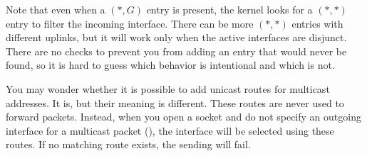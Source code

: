 Note that even when a $(*,G)$ entry is present, the kernel looks for a $(*,*)$
entry to filter the incoming interface. There can be more $(*,*)$ entries with
different uplinks, but it will work only when the active interfaces are
disjunct. There are no checks to prevent you from adding an entry that would
never be found, so it is hard to guess which behavior is intentional and which
is not.

You may wonder whether it is possible to add unicast routes for multicast
addresses. It is, but their meaning is different. These routes are never used
to forward packets. Instead, when you open a socket and do not specify an
outgoing interface for a multicast packet (), the interface
will be selected using these routes. If no matching route exists, the sending
will fail.
